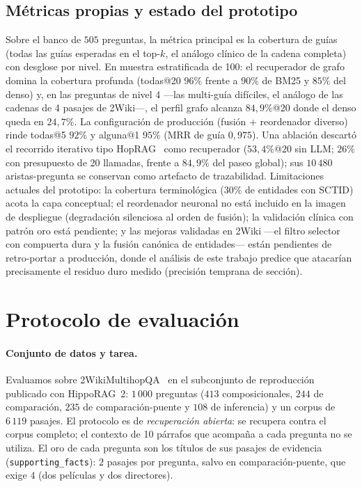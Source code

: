 \documentclass[11pt,a4paper]{article}
\newcommand{\hippo}{HippoRAG~2}
\begin{document}
\subsection{Métricas propias y estado del prototipo}

Sobre el banco de $505$ preguntas, la métrica principal es la cobertura de
guías (\guillemotleft{}todas las guías esperadas en el top-$k$\guillemotright{}, el análogo clínico de
la cadena completa) con desglose por nivel. En muestra estratificada de
100: el recuperador de grafo domina la cobertura profunda
(todas@20 $96\%$ frente a $90\%$ de BM25 y $85\%$ del denso) y, en las
preguntas de nivel 4 ---las multi-guía difíciles, el análogo de las
cadenas de 4 pasajes de 2Wiki---, el perfil grafo alcanza $84{,}9\%$@20
donde el denso queda en $24{,}7\%$. La configuración de producción (fusión
+ reordenador diverso) rinde todas@5 $92\%$ y alguna@1 $95\%$ (MRR de guía
$0{,}975$). Una ablación descartó el recorrido iterativo tipo
HopRAG~\cite{hoprag} como recuperador ($53{,}4\%$@20 sin LLM; $26\%$ con
presupuesto de 20 llamadas, frente a $84{,}9\%$ del paseo global); sus
$10\,480$ aristas-pregunta se conservan como artefacto de trazabilidad.
Limitaciones actuales del prototipo: la cobertura terminológica ($30\%$ de
entidades con SCTID) acota la capa conceptual; el reordenador neuronal no
está incluido en la imagen de despliegue (degradación silenciosa al orden
de fusión); la validación clínica con patrón oro está pendiente; y las
mejoras validadas en 2Wiki ---el filtro selector con compuerta dura y la
fusión canónica de entidades--- están pendientes de retro-portar a
producción, donde el análisis de este trabajo predice que atacarían
precisamente el residuo duro medido (precisión temprana de sección).

\section{Protocolo de evaluación}
\label{sec:protocolo}

\paragraph{Conjunto de datos y tarea.}
Evaluamos sobre 2WikiMultihopQA~\cite{wiki2} en el subconjunto de
reproducción publicado con \hippo{}: $1\,000$ preguntas ($413$ composicionales, $244$ de
comparación, $235$ de comparación-puente y $108$ de inferencia) y un corpus
de $6\,119$ pasajes. El protocolo es de \emph{recuperación abierta}: se
recupera contra el corpus completo; el contexto de 10 párrafos que acompaña
a cada pregunta no se utiliza. El oro de cada pregunta son los títulos de
sus pasajes de evidencia (\texttt{supporting\_facts}): $2$ pasajes por
pregunta, salvo en comparación-puente, que exige $4$ (dos películas y dos
directores).
\end{document}

